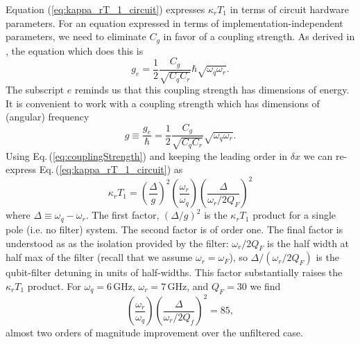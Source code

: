 Equation (\ref{eq:kappa_rT_1_circuit}) expresses $\kappa_r T_1$ in terms of circuit hardware parameters. For an equation expressed in terms of implementation-independent parameters, we need to eliminate $C_g$ in favor of a coupling strength.
As derived in \citeinternaltype {}, the equation which does this is \begin{equation}
g_e = \frac{1}{2}\frac{C_g}{\sqrt{C_q C_r}} \hbar \sqrt{\omega_q \omega_r}. \end{equation}
The subscript $e$ reminds us that this coupling strength has dimensions of energy. It is convenient to work with a coupling strength which has dimensions of (angular) frequency \begin{equation}
g \equiv \frac{g_e}{\hbar} = \frac{1}{2}\frac{C_g}{\sqrt{C_q C_r}} \sqrt{\omega_q \omega_r}. \label{eq:couplingStrength} \end{equation}
Using Eq.\,(\ref{eq:couplingStrength}) and keeping the leading order in $\delta x$ we can re-express Eq.\,(\ref{eq:kappa_rT_1_circuit}) as \begin{equation}
\kappa_r T_1 = \left( \frac{\Delta}{g} \right)^2 \left( \frac{\omega_r}{\omega_q} \right) \left( \frac{\Delta}{\omega_r / 2 Q_F} \right) ^2 \label{eq:kappa_rT_1} \end{equation}
where $\Delta \equiv \omega_q - \omega_r$.
The first factor, $\left( \Delta / g \right)^2$ is the $\kappa_r T_1$ product for a single pole (i.e. no filter) system.
The second factor is of order one.
The final factor is understood as as the isolation provided by the filter: $\omega_r / 2 Q_F$ is the half width at half max of the filter (recall that we assume $\omega_r = \omega_F$), so $\Delta / \left( \omega_r/2 Q_F \right)$ is the qubit-filter detuning in units of half-widths.
This factor substantially raises the $\kappa_r T_1$ product.
For $\omega_q=6\,\text{GHz}$, $\omega_r = 7\,\text{GHz}$, and $Q_F=30$ we find \begin{equation}
\left( \frac{\omega_r}{\omega_q} \right) \left( \frac{\Delta}{\omega_r / 2 Q_f} \right)^2 = 85, \end{equation}
almost two orders of magnitude improvement over the unfiltered case.